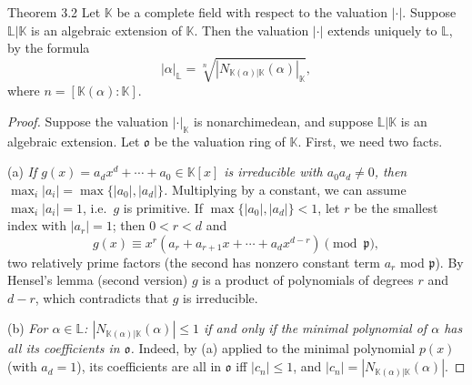 \documentclass[11pt]{article}
\begin{document}
\begin{thmbox}{Theorem 3.2}
Let $\mathbb{K}$ be a complete field with respect to the valuation $|\cdot|$. Suppose $\mathbb{L}|\mathbb{K}$ is an algebraic extension of $\mathbb{K}$. Then the valuation $|\cdot|$ extends uniquely to $\mathbb{L}$, by the formula
\[
|\alpha|_{\mathbb{L}} = \sqrt[n]{|N_{\mathbb{K}(\alpha)|\mathbb{K}}(\alpha)|_{\mathbb{K}}},
\]
where $n = [\mathbb{K}(\alpha) : \mathbb{K}]$.
\end{thmbox}

\begin{proof}
Suppose the valuation $|\cdot|_{\mathbb{K}}$ is nonarchimedean, and suppose $\mathbb{L}|\mathbb{K}$ is an algebraic extension. Let $\mathfrak{o}$ be the valuation ring of $\mathbb{K}$. First, we need two facts.

(a) \emph{If $g(x) = a_d x^d + \cdots + a_0 \in \mathbb{K}[x]$ is irreducible with $a_0 a_d \neq 0$, then $\max_i |a_i| = \max\{|a_0|, |a_d|\}$.} Multiplying by a constant, we can assume $\max_i |a_i| = 1$, i.e.\ $g$ is primitive. If $\max\{|a_0|, |a_d|\} < 1$, let $r$ be the smallest index with $|a_r| = 1$; then $0 < r < d$ and
\[
g(x) \equiv x^r (a_r + a_{r+1}x + \cdots + a_d x^{d-r}) \pmod{\mathfrak{p}},
\]
two relatively prime factors (the second has nonzero constant term $a_r$ mod $\mathfrak{p}$). By Hensel's lemma (second version) $g$ is a product of polynomials of degrees $r$ and $d - r$, which contradicts that $g$ is irreducible.

(b) \emph{For $\alpha \in \mathbb{L}$: $|N_{\mathbb{K}(\alpha)|\mathbb{K}}(\alpha)| \leq 1$ if and only if the minimal polynomial of $\alpha$ has all its coefficients in $\mathfrak{o}$.} Indeed, by (a) applied to the minimal polynomial $p(x)$ (with $a_d = 1$), its coefficients are all in $\mathfrak{o}$ iff $|c_n| \leq 1$, and $|c_n| = |N_{\mathbb{K}(\alpha)|\mathbb{K}}(\alpha)|$.


\end{proof}
\end{document}
